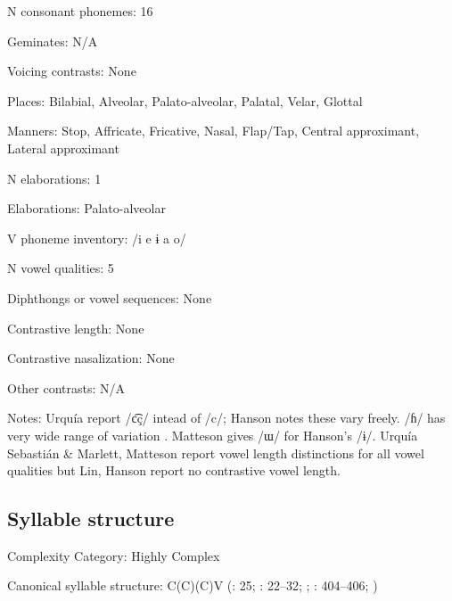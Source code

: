 {\begin{appendixdesc}
\item[N consonant phonemes:] 16

\item[Geminates:] N/A

\item[Voicing contrasts:] None

\item[Places:] Bilabial, Alveolar, Palato-alveolar, Palatal, Velar, Glottal

\item[Manners:] Stop, Affricate, Fricative, Nasal, Flap/Tap, Central approximant, Lateral approximant

\item[N elaborations:] 1

\item[Elaborations:] Palato-alveolar

\item[V phoneme inventory:] /i e ɨ a o/

\item[N vowel qualities:] 5

\item[Diphthongs or vowel sequences:] None

\item[Contrastive length:] None

\item[Contrastive nasalization:] None

\item[Other contrasts:] N/A

\item[Notes:] Urquía \citet{SebastiánMarlett2008} report /c͡ç/ intead of /c/; Hanson notes these vary freely. /ɦ/ has very wide range of variation \citep[20--23]{Hanson2010}. Matteson gives /ɯ/ for Hanson’s /ɨ/. Urquía Sebastián \& Marlett, Matteson report vowel length distinctions for all vowel qualities but Lin, Hanson report no contrastive vowel length.
\end{appendixdesc}
\subsection*{Syllable structure}
\begin{appendixdesc}

\item[Complexity Category:] Highly Complex

\item[Canonical syllable structure:] C(C)(C)V (\citealt{Hanson2010}: 25; \citealt{Matteson1965}: 22--32; \citealt{MattesonPike1958}; \citealt{Lin1997}: 404--406; \citealt{Lin1993})


\end{appendixdesc}}

